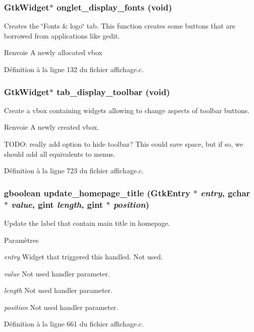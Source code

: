 \subsubsection[{onglet\_\-display\_\-fonts}]{\setlength{\rightskip}{0pt plus 5cm}GtkWidget$\ast$ onglet\_\-display\_\-fonts (void)}\label{affichage_8h_ab7ab35642d20a97b0129dc7df997c989}
Creates the \char`\"{}Fonts \& logo\char`\"{} tab. This function creates some buttons that are borrowed from applications like gedit.

\begin{DoxyReturn}{Renvoie}
A newly allocated vbox 
\end{DoxyReturn}


Définition à la ligne 132 du fichier affichage.c.

\subsubsection[{tab\_\-display\_\-toolbar}]{\setlength{\rightskip}{0pt plus 5cm}GtkWidget$\ast$ tab\_\-display\_\-toolbar (void)}\label{affichage_8h_ad383c9540bfca50409800d2d9869c3ac}
Create a vbox containing widgets allowing to change aspects of toolbar buttons.

\begin{DoxyReturn}{Renvoie}
A newly created vbox. 
\end{DoxyReturn}


TODO: really add option to hide toolbar? This could save space, but if so, we should add all equivalents to menus. 



Définition à la ligne 723 du fichier affichage.c.

\subsubsection[{update\_\-homepage\_\-title}]{\setlength{\rightskip}{0pt plus 5cm}gboolean update\_\-homepage\_\-title (GtkEntry $\ast$ {\em entry}, \/  gchar $\ast$ {\em value}, \/  gint {\em length}, \/  gint $\ast$ {\em position})}\label{affichage_8h_a540ad020b9ea9514f836a69f20e412cd}
Update the label that contain main title in homepage.


\begin{DoxyParams}{Paramètres}
\item[{\em entry}]Widget that triggered this handled. Not used. \item[{\em value}]Not used handler parameter. \item[{\em length}]Not used handler parameter. \item[{\em position}]Not used handler parameter. \end{DoxyParams}


Définition à la ligne 661 du fichier affichage.c.

